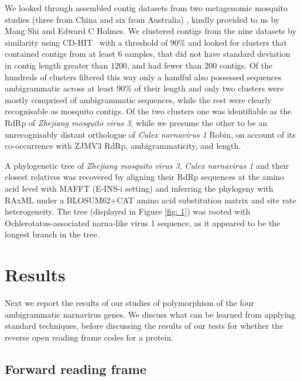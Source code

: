 \documentclass[unnumsec,webpdf,contemporary,large]{oup-authoring-template}%
\theoremstyle{thmstyleone}%
\theoremstyle{thmstyletwo}%
\theoremstyle{thmstylethree}%
\begin{document}
We looked through assembled contig datasets from two metagenomic mosquito
studies (three from China and six from Australia) \citep{shi_16,shi_17}, kindly
provided to us by Mang Shi and Edward C Holmes.  We clustered contigs from the
nine datasets by similarity using CD-HIT~\citep{fu_12} with a threshold of 90\%
and looked for clusters that contained contigs from at least $6$ samples, that
did not have standard deviation in contig length greater than $1 200$, and had
fewer than $200$ contigs.  Of the hundreds of clusters filtered this way only a
handful also possessed sequences ambigrammatic across at least 90\% of their
length and only two clusters were mostly comprised of ambigrammatic sequences,
while the rest were clearly recognisable as mosquito contigs.  Of the two
clusters one was identifiable as the RdRp of \emph{Zhejiang mosquito virus 3}, while
we presume the other to be an unrecognisably distant orthologue of \emph{Culex
narnavirus 1} Robin, on account of its co-occurrence with ZJMV3 RdRp,
ambigrammaticity, and length.

A phylogenetic tree of \emph{Zhejiang mosquito virus 3}, \emph{Culex
narnavirus 1} and their closest relatives was recovered by aligning their RdRp
sequences at the amino acid level with MAFFT (E-INS-i setting) \citep{katoh+05}
and inferring the phylogeny with RAxML \citep{stamatakis+14} under a
BLOSUM62+CAT \citep{henikoff+92,lartillot+04} amino acid substitution matrix
and site rate heterogeneity. The tree (displayed in Figure \ref{fig: 1}) was rooted
with Ochlerotatus-associated narna-like virus 1 sequence, as it appeared to be the longest
branch in the tree.

\section{Results}
\label{sec: 5}

Next we report the results of our studies of polymorphism of the four ambigrammatic narnavirus genes.
We discuss what can be learned from applying standard techniques, before discussing
the results of our tests for whether the reverse open reading frame codes for a protein.

\subsection{{\bf Forward reading frame}}
\label{sec: 5.1}
\end{document}
